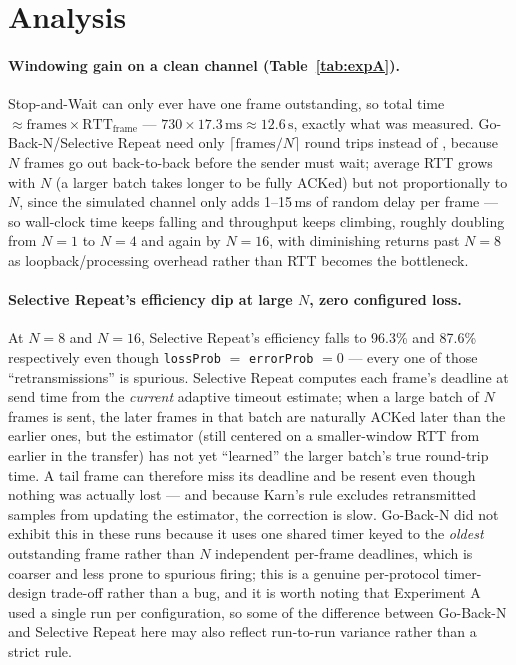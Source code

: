 \documentclass[11pt]{article}
\begin{document}
\section{Analysis}

\paragraph{Windowing gain on a clean channel (Table~\ref{tab:expA}).} Stop-and-Wait can
only ever have one frame outstanding, so total time $\approx \text{frames} \times
\text{RTT}_{\text{frame}}$ — $730 \times 17.3\,\text{ms} \approx 12.6\,\text{s}$, exactly
what was measured. Go-Back-N/Selective Repeat need only $\lceil \text{frames}/N \rceil$
round trips instead of , because $N$ frames go out back-to-back before the
sender must wait; average RTT grows with $N$ (a larger batch takes longer to be fully
ACKed) but not proportionally to $N$, since the simulated channel only adds 1--15\,ms of
random delay per frame — so wall-clock time keeps falling and throughput keeps climbing,
roughly doubling from $N{=}1$ to $N{=}4$ and again by $N{=}16$, with diminishing returns
past $N{=}8$ as loopback/processing overhead rather than RTT becomes the bottleneck.

\paragraph{Selective Repeat's efficiency dip at large $N$, zero configured loss.} At
$N{=}8$ and $N{=}16$, Selective Repeat's efficiency falls to 96.3\% and 87.6\% respectively
even though \texttt{lossProb} $=$ \texttt{errorProb} $=0$ — every one of those
``retransmissions'' is spurious. Selective Repeat computes each frame's deadline at send
time from the \emph{current} adaptive timeout estimate; when a large batch of $N$ frames is
sent, the later frames in that batch are naturally ACKed later than the earlier ones, but
the estimator (still centered on a smaller-window RTT from earlier in the transfer) has not
yet ``learned'' the larger batch's true round-trip time. A tail frame can therefore miss its
deadline and be resent even though nothing was actually lost — and because Karn's rule
excludes retransmitted samples from updating the estimator, the correction is slow. Go-Back-N
did not exhibit this in these runs because it uses one shared timer keyed to the
\emph{oldest} outstanding frame rather than $N$ independent per-frame deadlines, which is
coarser and less prone to spurious firing; this is a genuine per-protocol timer-design
trade-off rather than a bug, and it is worth noting that Experiment A used a single run per
configuration, so some of the difference between Go-Back-N and Selective Repeat here may
also reflect run-to-run variance rather than a strict rule.
\end{document}
